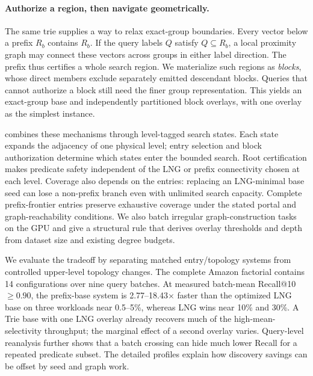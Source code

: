 \paragraph{Authorize a region, then navigate geometrically.}
The same trie supplies a way to relax exact-group boundaries. Every vector
below a prefix $R_b$ contains $R_b$. If the query labels $Q$ satisfy
$Q\subseteq R_b$, a local proximity graph may connect these vectors across
groups in either label direction. The prefix thus certifies a whole search
region. We materialize such regions as \emph{blocks}, whose direct members
exclude separately emitted descendant blocks. Queries that cannot authorize
a block still need the finer group representation. This yields an exact-group
base and independently partitioned block overlays, with one overlay as the
simplest instance.

\system{} combines these mechanisms through level-tagged search states. Each
state expands the adjacency of one physical level; entry selection and block
authorization determine which states enter the bounded search. Root certification makes predicate safety independent of the LNG or prefix
connectivity chosen at each level. Coverage also depends on the entries:
replacing an LNG-minimal base seed can lose a non-prefix branch even with
unlimited search capacity. Complete prefix-frontier entries preserve exhaustive
coverage under the stated portal and graph-reachability conditions. We also batch irregular graph-construction tasks on the GPU and give a
structural rule that derives overlay thresholds and depth from dataset size
and existing degree budgets.

We evaluate the tradeoff by separating matched entry/topology systems from
controlled upper-level topology changes. The complete Amazon factorial
contains 14 configurations over nine query batches. At measured batch-mean Recall@10
$\geq0.90$, the prefix-base system is 2.77--18.43$\times$ faster than the
optimized LNG base on three workloads near 0.5--5\%, whereas LNG wins near
10\% and 30\%. A Trie base with one LNG overlay already recovers much of
the high-mean-selectivity throughput; the marginal effect of a second
overlay varies. Query-level reanalysis further shows that a batch crossing
can hide much lower Recall for a repeated predicate subset. The detailed
profiles explain how discovery savings can be offset by seed and graph work.


